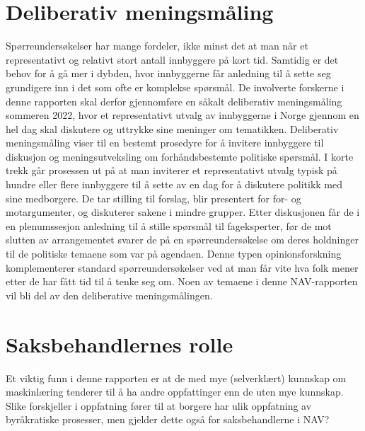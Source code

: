 \documentclass[
]{book}
\begin{document}
\hypertarget{deliberativ-meningsmuxe5ling}{%
\section{Deliberativ meningsmåling}\label{deliberativ-meningsmuxe5ling}}

Spørreundersøkelser har mange fordeler, ikke minst det at man når et representativt og relativt stort antall innbyggere på kort tid.
Samtidig er det behov for å gå mer i dybden, hvor innbyggerne får anledning til å sette seg grundigere inn i det som ofte er komplekse spørsmål.
De involverte forskerne i denne rapporten skal derfor gjennomføre en såkalt deliberativ meningsmåling sommeren 2022, hvor et representativt utvalg av innbyggerne i Norge gjennom en hel dag skal diskutere og uttrykke sine meninger om tematikken.
Deliberativ meningsmåling viser til en bestemt prosedyre for å invitere innbyggere til diskusjon og meningsutveksling om forhåndsbestemte politiske spørsmål.
I korte trekk går prosessen ut på at man inviterer et representativt utvalg typisk på hundre eller flere innbyggere til å sette av en dag for å diskutere politikk med sine medborgere.
De tar stilling til forslag, blir presentert for for- og motargumenter, og diskuterer sakene i mindre grupper.
Etter diskusjonen får de i en plenumssesjon anledning til å stille spørsmål til fageksperter, før de mot slutten av arrangementet svarer de på en spørreundersøkelse om deres holdninger til de politiske temaene som var på agendaen.
Denne typen opinionsforskning komplementerer standard spørreundersøkelser ved at man får vite hva folk mener etter de har fått tid til å tenke seg om.
Noen av temaene i denne NAV-rapporten vil bli del av den deliberative meningsmålingen.

\hypertarget{saksbehandlernes-rolle}{%
\section{Saksbehandlernes rolle}\label{saksbehandlernes-rolle}}

Et viktig funn i denne rapporten er at de med mye (selverklært) kunnskap om maskinlæring tenderer til å ha andre oppfattinger enn de uten mye kunnskap.
Slike forskjeller i oppfatning fører til at borgere har ulik oppfatning av byråkratiske prosesser, men gjelder dette også for saksbehandlerne i NAV?
\end{document}
